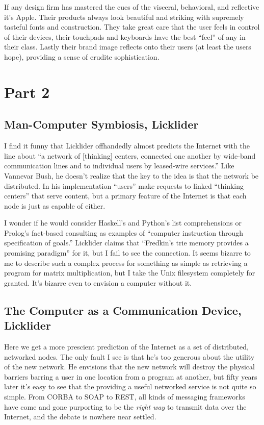 \documentclass{abrice}
\begin{document}
If any design firm has mastered the cues of the visceral, behavioral, and
reflective it's Apple. Their products always look beautiful and striking with
supremely tasteful fonts and construction. They take great care that the user
feels in control of their devices, their touchpads and keyboards have the best
``feel'' of any in their class. Lastly their brand image reflects onto their
users (at least the users hope), providing a sense of erudite sophistication.

\section{Part 2}

\subsection{Man-Computer Symbiosis, Licklider}

I find it funny that Licklider offhandedly almost predicts the Internet with the
line about ``a network of [thinking] centers, connected one another by wide-band
communication lines and to individual users by leased-wire services.'' Like
Vannevar Bush, he doesn't realize that the key to the idea is that the network
be distributed. In his implementation ``users'' make requests to linked ``thinking
centers'' that serve content, but a primary feature of the Internet is that each
node is just as capable of either.

I wonder if he would consider Haskell's and Python's list comprehensions or
Prolog's fact-based consulting as examples of ``computer instruction through
specification of goals.'' Licklider claims that ``Fredkin's trie memory provides
a promising paradigm'' for it, but I fail to see the connection. It seems bizarre
to me to describe such a complex process for something as simple as retrieving a
program for matrix multiplication, but I take the Unix filesystem completely
for granted. It's bizarre even to envision a computer without it.

\subsection{The Computer as a Communication Device, Licklider}

Here we get a more prescient prediction of the Internet as a set of distributed,
networked nodes. The only fault I see is that he's too generous about the
utility of the new network. He envisions that the new network will destroy the
physical barriers barring a user in one location from a program at another, but
fifty years later it's easy to see that the providing a useful networked service
is not quite so simple. From \textsc{CORBA} to \textsc{SOAP} to \textsc{REST},
all kinds of messaging frameworks have come and gone purporting to be the
\textit{right way} to transmit data over the Internet, and the debate is nowhere
near settled.
\end{document}
